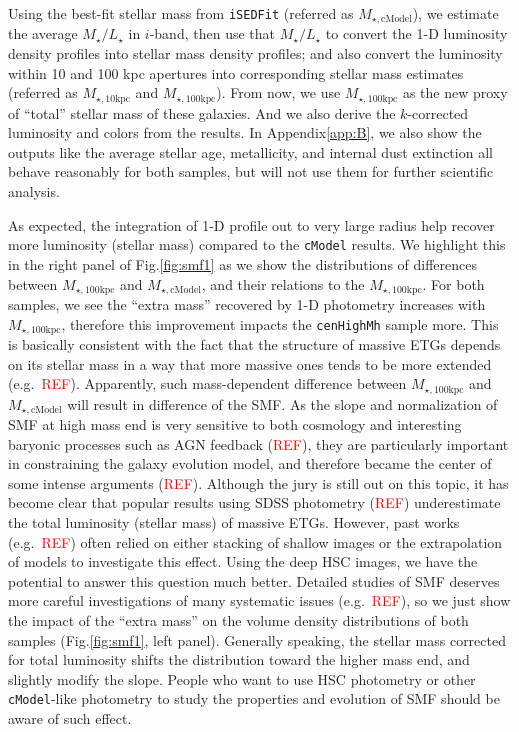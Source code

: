 \documentclass{emulateapj}
\def\cmodel{\texttt{cModel}}
\def\rbcg{\texttt{cenHighMh}}
\def\minn{{$M_{\star,10\mathrm{kpc}}$}}
\def\mtot{{$M_{\star,100\mathrm{kpc}}$}}
\def\mcmodel{{$M_{\star,\mathrm{cModel}}$}}
\def\m2l{{$M_{\star}/L_{\star}$}}
\newcommand{\addref}{{\textcolor{red}{REF}}}
\begin{document}
\begin{CJK*}{UTF8}{gbsn}
    Using the best-fit stellar mass from \texttt{iSEDFit} (referred as \mcmodel{}), 
    we estimate the average \m2l{} in $i$-band, then use that \m2l{} to convert the 
    1-D luminosity density profiles into stellar mass density profiles; and 
    also convert the luminosity within 10 and 100 kpc apertures into 
    corresponding stellar mass estimates (referred as \minn{} and \mtot{}). 
    From now, we use \mtot{} as the new proxy of ``total'' stellar mass of these 
    galaxies.  
    And we also derive the $k$-corrected luminosity and colors from the results.
    In Appendix\ref{app:B}, we also show the outputs like the average stellar age, 
    metallicity, and internal dust extinction all behave reasonably for both 
    samples, but will not use them for further scientific analysis. 
    
    As expected, the integration of 1-D profile out to very large radius help 
    recover more luminosity (stellar mass) compared to the \cmodel{} results.
    We highlight this in the right panel of Fig.\ref{fig:smf1} as we show the 
    distributions of differences between \mtot{} and \mcmodel{}, and their relations 
    to the \mtot{}.  
    For both samples, we see the ``extra mass'' recovered by 1-D photometry 
    increases with \mtot{}, therefore this improvement impacts the \rbcg{}
    sample more.  
    This is basically consistent with the fact that the structure of massive ETGs 
    depends on its stellar mass in a way that more massive ones tends to be 
    more extended (e.g.\ \addref).  
    Apparently, such mass-dependent difference between \mtot{} and \mcmodel{} will 
    result in difference of the SMF. 
    As the slope and normalization of SMF at high mass end is very sensitive 
    to both cosmology and interesting baryonic processes such as AGN feedback
    (\addref), they are particularly important in constraining the galaxy evolution
    model, and therefore became the center of some intense arguments (\addref).  
    Although the jury is still out on this topic, it has become clear that 
    popular results using SDSS photometry (\addref) underestimate the total 
    luminosity (stellar mass) of massive ETGs.  
    However, past works (e.g.\ \addref) often relied on either stacking of 
    shallow images or the extrapolation of models to investigate this effect. 
    Using the deep HSC images, we have the potential to answer this question 
    much better. 
    Detailed studies of SMF deserves more careful investigations of many 
    systematic issues (e.g.\ \addref), so we just show the impact of the 
    ``extra mass'' on the volume density distributions of both samples 
    (Fig.\ref{fig:smf1}, left panel).  
    Generally speaking, the stellar mass corrected for total luminosity 
    shifts the distribution toward the higher mass end, and slightly modify
    the slope. 
    People who want to use HSC photometry or other \cmodel{}-like photometry to 
    study the properties and evolution of SMF should be aware of such effect.
        

\end{CJK*}
\end{document}
